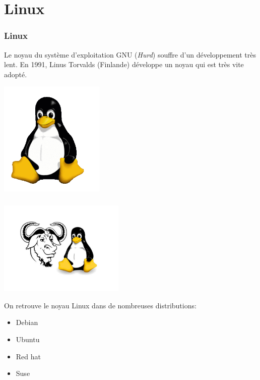 \documentclass[svgnames,11pt]{beamer}
\begin{document}
\section{Linux}
\begin{frame}
    \frametitle{Linux}

Le noyau du système d'exploitation GNU (\emph{Hurd}) souffre d'un développement très lent. En 1991, Linus Torvalds (Finlande) développe un noyau qui est très vite adopté.
\begin{center}
\centering
\includegraphics[width=5cm]{ressources/linux.png}
\label{IMG}
\end{center}
\end{frame}
\begin{frame}
    \frametitle{}

    \begin{center}
    \centering
    \includegraphics[width=6cm]{ressources/gnulinux.jpg}
    \label{IMG}
    \end{center}
On retrouve le noyau Linux dans de nombreuses distributions:
\begin{itemize}
    \item Debian
    \item Ubuntu
    \item Red hat
    \item Suse
\end{itemize}
\end{frame}
\end{document}
